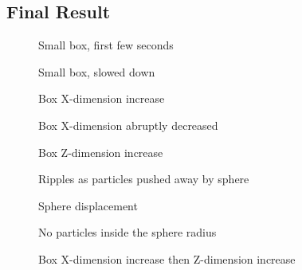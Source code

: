\documentclass[12pt]{article}
\newcommand{\wideimage}[2][]{%
  \makebox[\textwidth][c]{\texttt{[image: \#2]}}%
}
\begin{document}
    \subsection{Final Result}

    \begin{figure}[H]
        \wideimage[height=0.4\textheight]{smallBoxStart.png}
        \caption{Small box, first few seconds}
    \end{figure}

    \begin{figure}[H]
        \wideimage[height=0.4\textheight]{slowedDownSmallBox.png}
        \caption{Small box, slowed down}
    \end{figure}

    \begin{figure}[H]
        \wideimage[height=0.4\textheight]{xIncrease.png}
        \caption{Box X-dimension increase}
    \end{figure}

    \begin{figure}[H]
        \wideimage[height=0.4\textheight]{xDecrease.png}
        \caption{Box X-dimension abruptly decreased}
    \end{figure}
    
    \begin{figure}[H]
        \wideimage[height=0.4\textheight]{zIncrease.png}
        \caption{Box Z-dimension increase}
    \end{figure}

    \begin{figure}[H]
        \wideimage[height=0.4\textheight]{sphereRipples.png}
        \caption{Ripples as particles pushed away by sphere}
    \end{figure}

    \begin{figure}[H]
        \wideimage[height=0.4\textheight]{sphereDisplacement.png}
        \caption{Sphere displacement}
    \end{figure}

    \begin{figure}[H]
        \wideimage[height=0.4\textheight]{sphereDisplacementInside.png}
        \caption{No particles inside the sphere radius}
    \end{figure}

    \begin{figure}[H]
        \wideimage[height=0.4\textheight]{xIncreaseThenZIncrease.png}
        \caption{Box X-dimension increase then Z-dimension increase}
    \end{figure}
\end{document}

